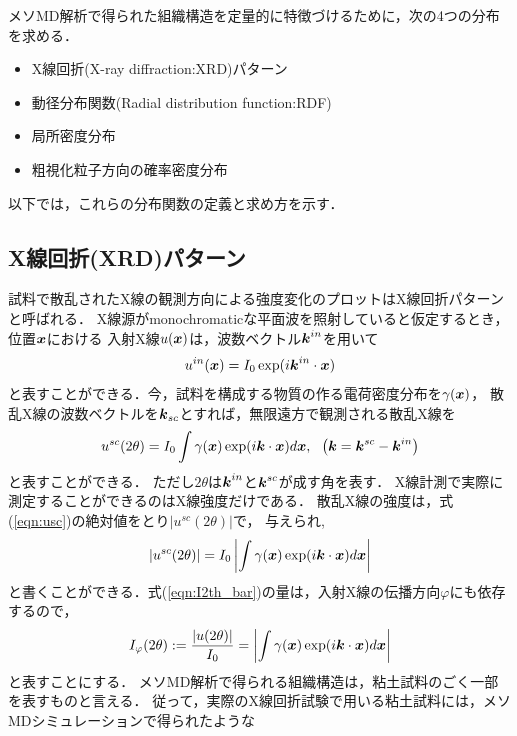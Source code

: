 ﻿メソMD解析で得られた組織構造を定量的に特徴づけるために，次の4つの分布を求める．
\begin{itemize}
	\item X線回折(X-ray diffraction:XRD)パターン
	\item 動径分布関数(Radial distribution function:RDF)
	\item 局所密度分布
	\item 粗視化粒子方向の確率密度分布
\end{itemize}
以下では，これらの分布関数の定義と求め方を示す．
\subsection{X線回折(XRD)パターン\cite{Warren}}
試料で散乱されたX線の観測方向による強度変化のプロットはX線回折パターンと呼ばれる．
X線源がmonochromaticな平面波を照射していると仮定するとき，位置$\mbox{\boldmath $x$}$における
入射X線$u(\mbox{\boldmath $x$})$は，波数ベクトル$\mbox{\boldmath $k$}^{in}$を用いて
\begin{equation}
	u^{in}(\mbox{\boldmath $x$})=I_0 \exp(i\mbox{\boldmath $k$}^{in}\cdot\mbox{\boldmath $x$})
	\label{eqn:uin}
\end{equation}
と表すことができる．今，試料を構成する物質の作る電荷密度分布を$\gamma(\mbox{\boldmath $x$})$，
散乱X線の波数ベクトルを$\mbox{\boldmath $k$}_{sc}$とすれば，無限遠方で観測される散乱X線を
\begin{equation}
	u^{sc}(2\theta)=I_0 \int \gamma(\fat{x})\exp(i\fat{k}\cdot\fat{x})d\fat{x}, \ \ 
	\left(\fat{k}=\fat{k}^{sc}-\fat{k}^{in}\right)
	\label{eqn:usc}
\end{equation}
と表すことができる．
ただし$2\theta$は$\mbox{\boldmath $k$}^{in}$と$\mbox{\boldmath $k$}^{sc}$が成す角を表す．
X線計測で実際に測定することができるのはX線強度だけである．
散乱X線の強度は，式(\ref{eqn:usc})の絶対値をとり$\left| u^{sc}(2\theta)\right|$で，
与えられ,
\begin{equation}
	\left|u^{sc}(2\theta)\right|
	=
	I_0\left|\int \gamma(\mbox{\boldmath $x$}) \exp(i\mbox{\boldmath $k$}\cdot \mbox{\boldmath $x$}) d\mbox{\boldmath $x$} \right|
	\label{eqn:I2th_bar}
\end{equation}
と書くことができる．式(\ref{eqn:I2th_bar})の量は，入射X線の伝播方向$\varphi$にも依存するので，
\begin{equation}
	I_\varphi(2\theta):
		=\frac{\left|u(2\theta)\right|}{I_0}
		=
	\left|\int \gamma(\mbox{\boldmath $x$}) \exp(i\mbox{\boldmath $k$}\cdot \mbox{\boldmath $x$}) d\mbox{\boldmath $x$} \right|
	\label{eqn:Iphi}
\end{equation}
と表すことにする．
メソMD解析で得られる組織構造は，粘土試料のごく一部を表すものと言える．
従って，実際のX線回折試験で用いる粘土試料には，メソMDシミュレーションで得られたような
